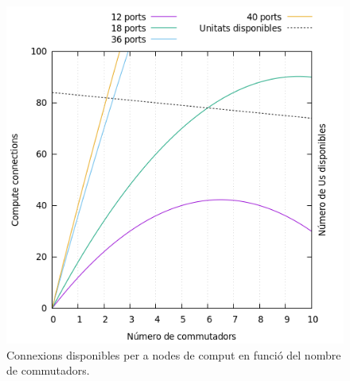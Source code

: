 \begin{figure}[h!]
    \centering
    \includegraphics[width=0.8\linewidth]{img/connections.png}
    \caption{Connexions disponibles per a nodes de comput en funció del nombre de commutadors.}
    
    \label{fig:connections}
\end{figure}

